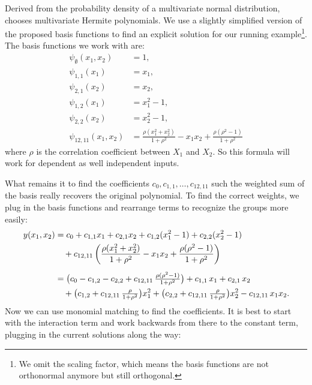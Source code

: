 Derived from the probability density of a multivariate normal distribution, \cite{rahman2014} chooses multivariate Hermite polynomials. We use a slightly simplified version of the proposed basis functions to find an explicit solution for our running example\footnote{We omit the scaling factor, which means the basis functions are not orthonormal anymore but still orthogonal.}. The basis functions we work with are:
\[
\begin{aligned}
\psi_{\emptyset}(x_1,x_2) &= 1, \\
\psi_{1,1}(x_1) &= x_1, \\
\psi_{2,1}(x_2) &= x_2, \\
\psi_{1,2}(x_1) &= x_1^2 - 1, \\
\psi_{2,2}(x_2) &= x_2^2 - 1, \\
\psi_{12,11}(x_1,x_2) &= \frac{\rho (x_1^2 + x_2^2)}{1 + \rho^2} 
                         - x_1 x_2 
                         + \frac{\rho(\rho^2 - 1)}{1 + \rho^2}
\end{aligned}
\]
where $\rho$ is the correlation coefficient between $X_1$ and $X_2$. So this formula will work for dependent as well independent inputs.\par
What remains it to find the coefficients $c_0, c_{1,1}, \dots, c_{12, 11}$ such the weighted sum of the basis really recovers the original polynomial.
To find the correct weights, we plug in the basis functions and rearrange terms to recognize the groups more easily:
\begin{align*}
y(x_1,x_2) &= c_0 + c_{1,1} x_1 + c_{2,1} x_2 
+ c_{1,2}(x_1^2 - 1) + c_{2,2}(x_2^2 - 1) \notag \\ 
&\quad + c_{12, 11}\left( \frac{\rho(x_1^2 + x_2^2)}{1 + \rho^2} 
- x_1 x_2 
+ \frac{\rho(\rho^2 - 1)}{1 + \rho^2} \right) \\[5pt]
&= 
\big( c_0 - c_{1,2} - c_{2,2} + c_{12, 11}\,\tfrac{\rho(\rho^2 - 1)}{1+\rho^2} \big)
+ c_{1,1}\,x_1 
+ c_{2,1}\,x_2 \notag \\ 
&\quad + \big( c_{1,2} + c_{12, 11}\,\tfrac{\rho}{1+\rho^2} \big) x_1^2
+ \big( c_{2,2} + c_{12, 11}\,\tfrac{\rho}{1+\rho^2} \big) x_2^2
- c_{12, 11}\, x_1 x_2.
\end{align*}
Now we can use monomial matching to find the coefficients. It is best to start with the interaction term and work backwards from there to the constant term, plugging in the current solutions along the way:

